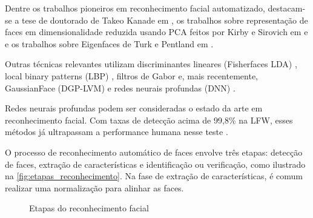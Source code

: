 Dentre os trabalhos pioneiros em reconhecimento facial automatizado, destacam-se a tese de doutorado de Takeo Kanade em \citeyear{kanade1973picture}, os trabalhos sobre representação de faces em dimensionalidade reduzida usando PCA feitos por Kirby e Sirovich em \citeyear{sirovich1987low} e \citeyear{kirby1990application} e os trabalhos sobre Eigenfaces de Turk e Pentland em \citeyear{turk1991eigenfaces}.

Outras técnicas relevantes utilizam discriminantes lineares (Fisherfaces LDA) \cite{belhumeur1997eigenfaces, etemad1996face}, local binary patterns (LBP) \cite{ojala1994performance}, filtros de Gabor \cite{lades1993distortion, wiskott1997face, gonccalves2016robusto} e, mais recentemente, GaussianFace (DGP-LVM) \cite{lu2015surpassing} e redes neurais profundas (DNN) \cite{taigman2014deepface, he2015delving, sun2014deep, sun2014predict, sun2015deeply, zhu2014recover, schroff2015facenet, zhou2015naive, yi2014learning, sun2015deepid3, amos2016openface}.

Redes neurais profundas podem ser consideradas o estado da arte em reconhecimento facial. Com taxas de detecção acima de 99,8\% na LFW, esses métodos já ultrapassam a performance humana nesse teste \cite{learned2016labeled, kumar2009attribute}.

O processo de reconhecimento automático de faces envolve três etapas: detecção de faces, extração de características e identificação ou verificação, como ilustrado na \autoref{fig:etapas_reconhecimento}. Na fase de extração de características, é comum realizar uma normalização para alinhar as faces.

\begin{figure}[htbp]
    \caption{Etapas do reconhecimento facial}
    \label{fig:etapas_reconhecimento}
    \begin{adjustbox}{max width=\textwidth}
    \end{adjustbox}
\end{figure}

